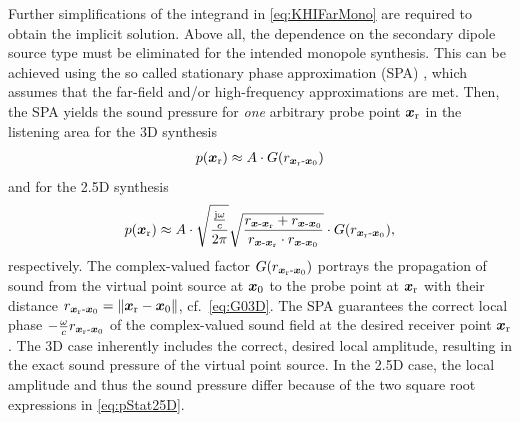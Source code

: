 Further simplifications of the integrand in \myeq\eqref{eq:KHIFarMono}
are required to obtain the implicit solution.
%
Above all, the dependence on the secondary dipole source type
must be eliminated for the intended monopole synthesis.
%
This can be achieved using the so called stationary phase approximation
(SPA) \cite[Ch.~3.1]{Start1997_diss},
\cite[Ch.~3.3]{Firtha2019_diss} which assumes that the
far-field and/or high-frequency approximations are met.
%
Then, the SPA yields the sound pressure for \textit{one} arbitrary
probe point $\bm{x}_\mathrm{r}$ in the listening area for the 3D synthesis
%
\begin{align}
\label{eq:pStat3D}
p(\bm{x}_\mathrm{r}) \approx A \cdot G(r_{\bm{x}_\mathrm{r}\text{-}\bm{x}_\mathrm{0}})
\end{align}
%
and for the 2.5D synthesis
%
\begin{align}
\label{eq:pStat25D}
p(\xr) \approx A\cdot
\sqrt{\frac{\frac{\im \omega}{c}}{2\pi}}\sqrt{\frac{r_{\xs\text{-}\xr} + r_{\xs\text{-}\xp}}{r_{\xs\text{-}\xr} \cdot r_{\xs\text{-}\xp}}}\cdot G(r_{\xr\text{-}\xp}),
\end{align}
respectively.
%
The complex-valued factor $G(r_{\bm{x}_\mathrm{r}\text{-}\bm{x}_\mathrm{0}})$ portrays the propagation of
sound from the virtual point source at $\bm{x}_\mathrm{0}$ to the probe point at $\bm{x}_\mathrm{r}$
with their distance $r_{\bm{x}_\mathrm{r}\text{-}\bm{x}_\mathrm{0}} = \|\bm{x}_\mathrm{r}-\bm{x}_\mathrm{0}\|$, cf.~\eqref{eq:G03D}.
%
The SPA guarantees the correct local phase $-\frac{\omega}{c} r_{\bm{x}_\mathrm{r}\text{-}\bm{x}_\mathrm{0}}$
of the complex-valued sound field at the desired receiver point $\bm{x}_\mathrm{r}$.
%
The 3D case inherently includes the correct, desired local amplitude,
resulting in the exact sound pressure of the virtual point source.
%
In the 2.5D case, the local amplitude and thus the sound pressure differ
because of the two square root expressions in \myeq\eqref{eq:pStat25D}.



